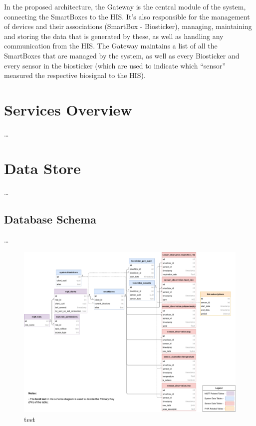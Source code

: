 

In the proposed architecture, the Gateway is the central module of the system, connecting the SmartBoxes to the \acs{HIS}. It's also responsible for the management of devices and their associations (SmartBox - Biosticker), managing, maintaining and storing the data that is generated by these, as well as handling any communication from the \acs{HIS}. The Gateway maintains a list of all the SmartBoxes that are managed by the system, as well as every Biosticker and every sensor in the biosticker (which are used to indicate which ``sensor'' measured the respective biosignal to the \acs{HIS}). 


\section{Services Overview}
\dots 
\section{Data Store}
\dots 


\subsection{Database Schema}
\dots 

\begin{figure}[H]
    \centering
    \includegraphics[width=\linewidth]{images/database-schema-general.pdf}
    \caption[test]{test}
    \label{fig:wow-dbschema-full}
\end{figure}

